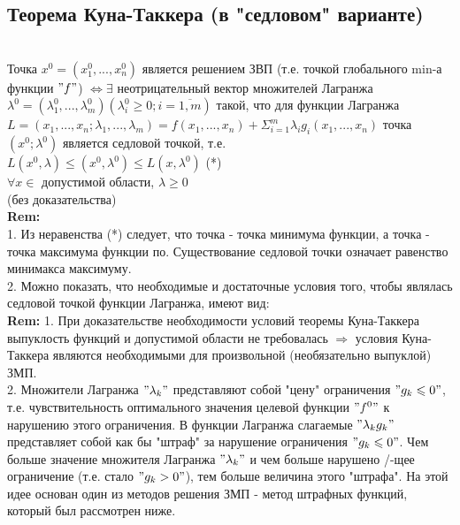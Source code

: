 \subsection*{Теорема Куна-Таккера (в "седловом" варианте)} \\
Точка $x^0 = (x_1^0, ..., x_n^0)$ является решением ЗВП (т.е. точкой глобального min-а функции $"f"$) $\Leftrightarrow \exists$ неотрицательный вектор множителей Лагранжа \\
$\lambda^0 = (\lambda_1^0, ... , \lambda_m^0) (\lambda_i^0 \geqslant 0; i = \overline{1, m})$ такой, что для функции Лагранжа \\
$L = (x_1, ..., x_n; \lambda_1, ..., \lambda_m) = f(x_1, ... , x_n) + \Sigma_{i = 1}^m \lambda_i g_i (x_1, ... , x_n)$ точка $(x^0; \lambda^0)$ является седловой точкой, т.е. \\
$L(x^0, \lambda) \leqslant (x^0, \lambda^0) \leqslant L(x, \lambda^0)$ (*) \\
$\forall x \in$ допустимой области, $\lambda \geqslant 0$ \\
(без доказательства) \\

\textbf{Rem:} \\
1. Из неравенства (*) следует, что точка - точка минимума функции, а точка - точка максимума функции по. Существование седловой точки означает равенство минимакса максимуму. \\
2. Можно показать, что необходимые и достаточные условия того, чтобы являлась седловой точкой функции Лагранжа, имеют вид: \\

\textbf{Rem: }
1. При доказательстве необходимости условий теоремы Куна-Таккера выпуклость функций и допустимой области не требовалась $\Rightarrow$ условия Куна-Таккера являются необходимыми для произвольной (необязательно выпуклой) ЗМП. \\
2. Множители Лагранжа $"\lambda_k"$ представляют собой "цену" ограничения $"g_k \leqslant 0"$, т.е. чувствительность оптимального значения целевой функции $"f^0"$ к нарушению этого ограничения. В функции Лагранжа слагаемые $"\lambda_k g_k"$ представляет собой как бы "штраф" за нарушение ограничения $"g_k \leqslant 0"$. Чем больше значение множителя Лагранжа $"\lambda_k"$ и чем больше нарушено /-щее ограничение (т.е. стало $"g_k > 0"$), тем больше величина этого "штрафа". На этой идее основан один из методов решения ЗМП - метод штрафных функций, который был рассмотрен ниже. \\

